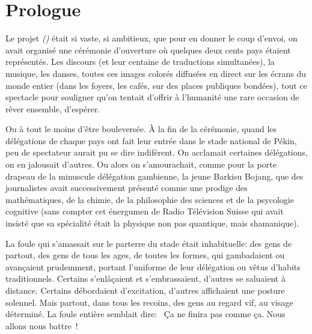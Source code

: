 \chapter*{Prologue}

Le projet \textit{\nomProjet{} (\nomProjetEn{})} était si vaste, si ambitieux,
que pour en donner le coup d'envoi, on avait organisé une cérémonie d'ouverture
où quelques deux cents pays étaient représentés.  
%
Les discours (et leur centaine de traductions simultanées), la musique, les
danses, toutes ces images colorés diffusées en direct sur les écrans du monde
entier (dans les foyers, les cafés, sur des places publiques bondées), tout ce
spectacle pour souligner qu'on tentait d'offrir à l'humanité une rare occasion
de rêver ensemble, d'espérer.

Ou à tout le moins d'être bouleversée.
%
À la fin de la cérémonie, quand les délégations de chaque pays ont fait leur
entrée dans le stade national de Pékin, peu de spectateur aurait pu se dire
indiférent.
%
On acclamait certaines délégations, on en jalousait d'autres.  
%
Ou alors on s'amourachait, comme pour la porte drapeau de la minuscule délégation
gambienne, la jeune Barkisu Bojang, que des journalistes avait successivement
présenté comme une prodige des mathématiques, de la chimie, de la philosophie
des sciences et de la psycologie cognitive (sans compter cet énergumen de Radio
Télévision Suisse qui avait insisté que sa spécialité était la physique non pas
quantique, mais shamanique).

La foule qui s'amassait sur le parterre du stade était inhabituelle: des gens
de partout, des gens de tous les ages, de toutes les formes, qui gambadaient ou
avançaient prudemment, portant l'uniforme de leur délégation ou vêtus d'habits
traditionnels. Certains s'enlâçaient et s'embrassaient, d'autres se saluaient à
distance.  Certains débor\-daient d'excitation, d'autres affichaient une
posture solennel.  Mais partout, dans tous les recoins, des gens au regard vif,
au visage déterminé.
%
La foule entière semblait dire: \og~Ça ne finira pas comme ça.  Nous allons nous battre~\fg!

